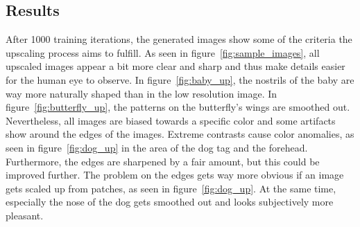\documentclass[11pt,twocolumn,twoside,paper=a4]{IEEEtran}
\begin{document}
\subsection{Results}
After 1000 training iterations, the generated images show some of the criteria the upscaling process aims to fulfill.
As seen in figure~\ref{fig:sample_images}, all upscaled images appear a bit more clear and sharp and thus make details easier for the human eye to observe.
In figure~\ref{fig:baby_up}, the nostrils of the baby are way more naturally shaped than in the low resolution image. 
In figure~\ref{fig:butterfly_up}, the patterns on the butterfly's wings are smoothed out. 
Nevertheless, all images are biased towards a specific color and some artifacts show around the edges of the images.
Extreme contrasts cause color anomalies, as seen in figure~\ref{fig:dog_up} in the area of the dog tag and the forehead.
Furthermore, the edges are sharpened by a fair amount, but this could be improved further.
The problem on the edges gets way more obvious if an image gets scaled up from patches, as seen in figure~\ref{fig:dog_up}. 
At the same time, especially the nose of the dog gets smoothed out and looks subjectively more pleasant.
\end{document}
